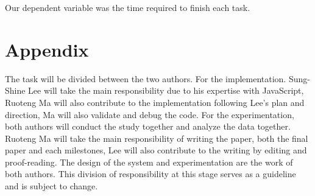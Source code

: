 \documentclass{sigchi}
\begin{document}
Our dependent variable was the time required to finish each task.


\balance{}




\section{Appendix}
The task will be divided between the two authors. For the implementation. Sung-Shine Lee will take the main responsibility due to his expertise with JavaScript, Ruoteng Ma will also contribute to the implementation following Lee's plan and direction, Ma will also validate and debug the code. For the experimentation, both authors will conduct the study together and analyze the data together. Ruoteng Ma will take the main responsibility of writing the paper, both the final paper and each milestones, Lee will also contribute to the writing by editing and proof-reading. The design of the system and experimentation are the work of both authors. This division of responsibility at this stage serves as a guideline and is subject to change.   
\end{document}
